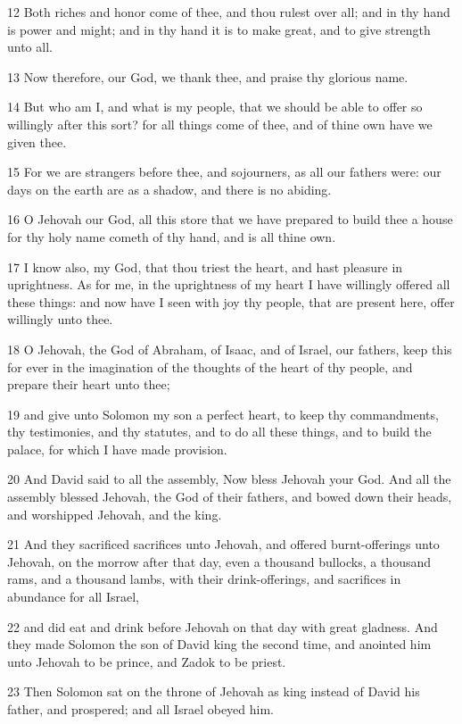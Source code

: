 \par 12 Both riches and honor come of thee, and thou rulest over all; and in thy hand is power and might; and in thy hand it is to make great, and to give strength unto all.
\par 13 Now therefore, our God, we thank thee, and praise thy glorious name.
\par 14 But who am I, and what is my people, that we should be able to offer so willingly after this sort? for all things come of thee, and of thine own have we given thee.
\par 15 For we are strangers before thee, and sojourners, as all our fathers were: our days on the earth are as a shadow, and there is no abiding.
\par 16 O Jehovah our God, all this store that we have prepared to build thee a house for thy holy name cometh of thy hand, and is all thine own.
\par 17 I know also, my God, that thou triest the heart, and hast pleasure in uprightness. As for me, in the uprightness of my heart I have willingly offered all these things: and now have I seen with joy thy people, that are present here, offer willingly unto thee.
\par 18 O Jehovah, the God of Abraham, of Isaac, and of Israel, our fathers, keep this for ever in the imagination of the thoughts of the heart of thy people, and prepare their heart unto thee;
\par 19 and give unto Solomon my son a perfect heart, to keep thy commandments, thy testimonies, and thy statutes, and to do all these things, and to build the palace, for which I have made provision.
\par 20 And David said to all the assembly, Now bless Jehovah your God. And all the assembly blessed Jehovah, the God of their fathers, and bowed down their heads, and worshipped Jehovah, and the king.
\par 21 And they sacrificed sacrifices unto Jehovah, and offered burnt-offerings unto Jehovah, on the morrow after that day, even a thousand bullocks, a thousand rams, and a thousand lambs, with their drink-offerings, and sacrifices in abundance for all Israel,
\par 22 and did eat and drink before Jehovah on that day with great gladness. And they made Solomon the son of David king the second time, and anointed him unto Jehovah to be prince, and Zadok to be priest.
\par 23 Then Solomon sat on the throne of Jehovah as king instead of David his father, and prospered; and all Israel obeyed him.
